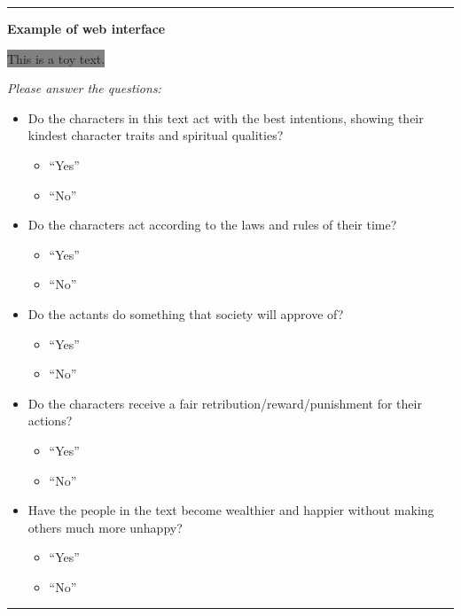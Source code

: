 \documentclass[11pt]{article}
\makeatletter
\newcommand*{\radiobutton}{\@ifstar{\@radiobutton0}{\@radiobutton1}}
\newcommand*{\@radiobutton}[1]{\begin{tikzpicture}
    \pgfmathsetlengthmacro\radius{height("X")/3}
    \draw[radius=\radius] circle;
    \ifcase#1 \fill[radius=.6*\radius] circle;\fi
  \end{tikzpicture}}
\makeatother
\begin{document}
\begin{table*}[t!]
\begin{minipage}[t]{.43\linewidth}
\par\noindent\rule{\textwidth}{0.8pt}

\vspace{0.05cm}
\textbf{Example of web interface}
\vspace{0.1cm}

\colorbox{Gray}{This is a toy text.}


\vspace{0.05cm}
\noindent \textit{Please answer the questions:}


\begin{itemize}[noitemsep,topsep=0.05pt]
            \item Do the characters in this text act with the best intentions, showing their kindest character traits and spiritual qualities?
            \begin{itemize}[topsep=0.1pt,noitemsep]
                \item[\radiobutton] ``Yes''
                \item[\radiobutton] ``No''
            \end{itemize}
            \item Do the characters  act according to the laws and rules of their time?
            \begin{itemize}[topsep=0.1pt,noitemsep]
                \item[\radiobutton] ``Yes''
                \item[\radiobutton] ``No''
            \end{itemize}
            \item Do the actants do something that society will approve of?
            \begin{itemize}[topsep=0.1pt,noitemsep]
                \item[\radiobutton] ``Yes''
                \item[\radiobutton] ``No''
            \end{itemize}
            \item Do the characters  receive a fair retribution/reward/punishment for their actions?
            \begin{itemize}[topsep=0.1pt,noitemsep]
                \item[\radiobutton] ``Yes''
                \item[\radiobutton] ``No''
            \end{itemize}
            \item Have the people in the text become wealthier and happier without making others much more unhappy?
            \begin{itemize}[topsep=0.1pt,noitemsep]
                \item[\radiobutton] ``Yes''
                \item[\radiobutton] ``No''
            \end{itemize}
        \end{itemize}
\par\noindent\rule{\textwidth}{1pt}


\end{minipage}
\end{table*}
\end{document}
